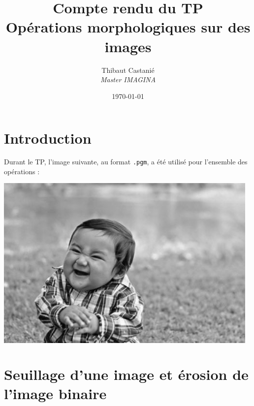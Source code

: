 \documentclass[a4paper,11pt]{article}
\begin{document}
\title{\textbf{Compte rendu du TP }\\Opérations morphologiques sur des images}
\author{Thibaut Castanié\\\textit{Master IMAGINA}}
\date{\today}

\maketitle
\thispagestyle{empty}

\newpage 
\section*{Introduction}
Durant le TP, l'image suivante, au format \texttt{.pgm}, a été utilisé pour l'ensemble des opérations :
\begin{center}
\includegraphics[scale=0.7]{baby.png}
\end{center}
\section{Seuillage d'une image et érosion de l'image binaire}
\end{document}
